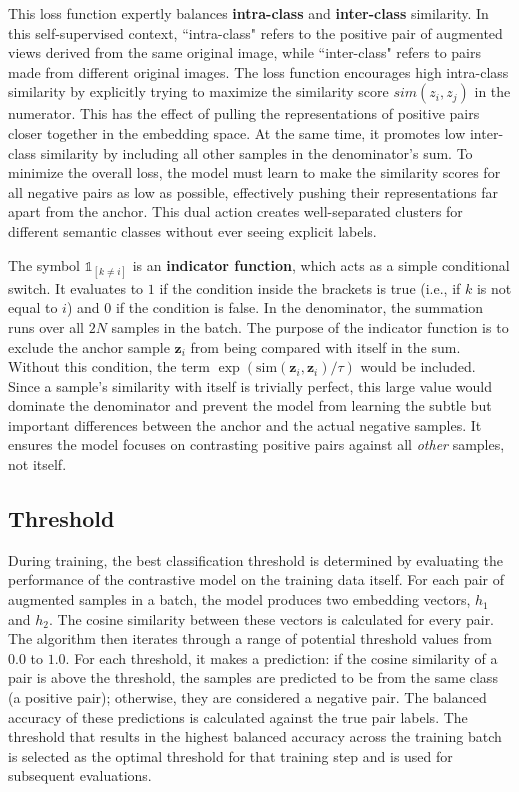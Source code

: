 This loss function expertly balances \textbf{intra-class} and \textbf{inter-class} similarity. In this self-supervised context, ``intra-class" refers to the positive pair of augmented views derived from the same original image, while ``inter-class" refers to pairs made from different original images. The loss function encourages high intra-class similarity by explicitly trying to maximize the similarity score $sim(z_i, z_j)$ in the numerator. This has the effect of pulling the representations of positive pairs closer together in the embedding space. At the same time, it promotes low inter-class similarity by including all other samples in the denominator's sum. To minimize the overall loss, the model must learn to make the similarity scores for all negative pairs as low as possible, effectively pushing their representations far apart from the anchor. This dual action creates well-separated clusters for different semantic classes without ever seeing explicit labels.

The symbol $\mathbb{1}_{[k \neq i]}$ is an \textbf{indicator function}, which acts as a simple conditional switch. It evaluates to $1$ if the condition inside the brackets is true (i.e., if $k$ is not equal to $i$) and $0$ if the condition is false. In the denominator, the summation runs over all $2N$ samples in the batch. The purpose of the indicator function is to exclude the anchor sample $\mathbf{z}_i$ from being compared with itself in the sum. Without this condition, the term $\exp(\text{sim}(\mathbf{z}_i, \mathbf{z}_i) / \tau)$ would be included. Since a sample's similarity with itself is trivially perfect, this large value would dominate the denominator and prevent the model from learning the subtle but important differences between the anchor and the actual negative samples. It ensures the model focuses on contrasting positive pairs against all \textit{other} samples, not itself.

\subsection{Threshold}

During training, the best classification threshold is determined by evaluating the performance of the contrastive model on the training data itself. For each pair of augmented samples in a batch, the model produces two embedding vectors, $h_1$ and $h_2$. The cosine similarity between these vectors is calculated for every pair. The algorithm then iterates through a range of potential threshold values from $0.0$ to $1.0$. For each threshold, it makes a prediction: if the cosine similarity of a pair is above the threshold, the samples are predicted to be from the same class (a positive pair); otherwise, they are considered a negative pair. The balanced accuracy of these predictions is calculated against the true pair labels. The threshold that results in the highest balanced accuracy across the training batch is selected as the optimal threshold for that training step and is used for subsequent evaluations.

